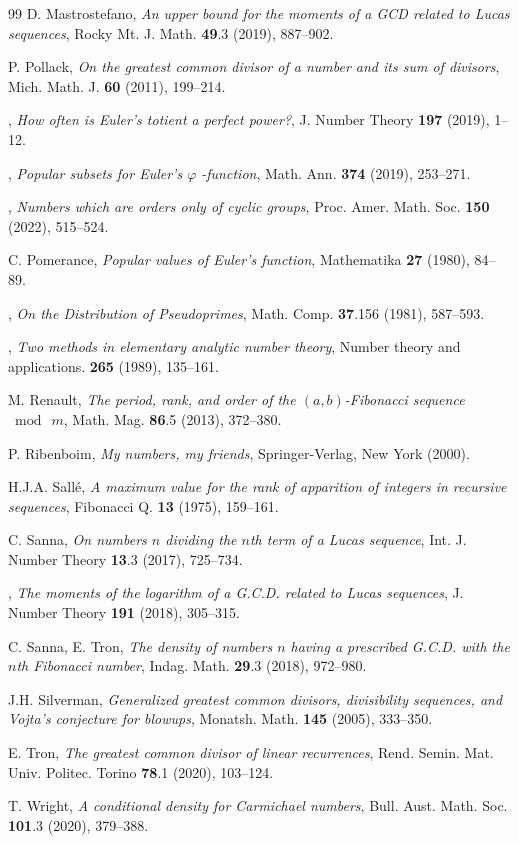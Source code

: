\documentclass[12pt,a4paper,oneside]{amsart}
\begin{document}
\begin{thebibliography}{99}
 D. Mastrostefano, \textit{An upper bound for the moments of a GCD related to Lucas sequences}, Rocky Mt. J. Math. \textbf{49}.3 (2019), 887--902.

 P. Pollack, \textit{On the greatest common divisor of a number and its sum of divisors}, Mich. Math. J. \textbf{60} (2011), 199--214.

 \bysame, \textit{How often is Euler's totient a perfect power?}, J. Number Theory \textbf{197} (2019), 1--12.

 \bysame, \textit{Popular subsets for Euler’s $\varphi$ -function}, Math. Ann. \textbf{374} (2019), 253--271.


 \bysame, \textit{Numbers which are orders only of cyclic groups}, Proc. Amer. Math. Soc. \textbf{150} (2022), 515--524.


 C. Pomerance, \textit{Popular values of Euler’s function}, Mathematika \textbf{27} (1980), 84--89.

 \bysame, \textit{On the Distribution of Pseudoprimes}, Math. Comp. \textbf{37}.156 (1981), 587--593.

\bysame, \textit{Two methods in elementary analytic number theory}, Number theory and applications. \textbf{265} (1989), 135--161.


 M. Renault, \textit{The period, rank, and order of the $(a,b)$-Fibonacci sequence $\bmod\ m$}, Math. Mag. \textbf{86}.5 (2013), 372--380.

 P. Ribenboim, \textit{My numbers, my friends}, Springer-Verlag, New York (2000).

 H.J.A. Sall\'{e}, \textit{A maximum value for the rank of apparition of integers in recursive sequences}, Fibonacci Q. \textbf{13} (1975), 159--161.

 C. Sanna, \textit{On numbers $n$ dividing the $n$th term of a Lucas sequence}, Int. J. Number Theory \textbf{13}.3 (2017), 725--734.

 \bysame, \textit{The moments of the logarithm of a G.C.D. related to Lucas sequences}, J. Number Theory \textbf{191} (2018), 305--315.

 C. Sanna, E. Tron, \textit{The density of numbers $n$ having a prescribed G.C.D. with the $n$th Fibonacci number}, Indag. Math. \textbf{29}.3 (2018), 972--980.

 J.H. Silverman, \textit{Generalized greatest common divisors, divisibility sequences, and Vojta's conjecture for blowups}, Monatsh. Math. \textbf{145} (2005), 333--350.


 E. Tron, \textit{The greatest common divisor of linear recurrences}, Rend. Semin. Mat. Univ. Politec. Torino \textbf{78}.1 (2020), 103--124.

 T. Wright, \textit{A conditional density for Carmichael numbers}, Bull. Aust. Math. Soc. \textbf{101}.3 (2020), 379--388.
\end{thebibliography}
\end{document}
